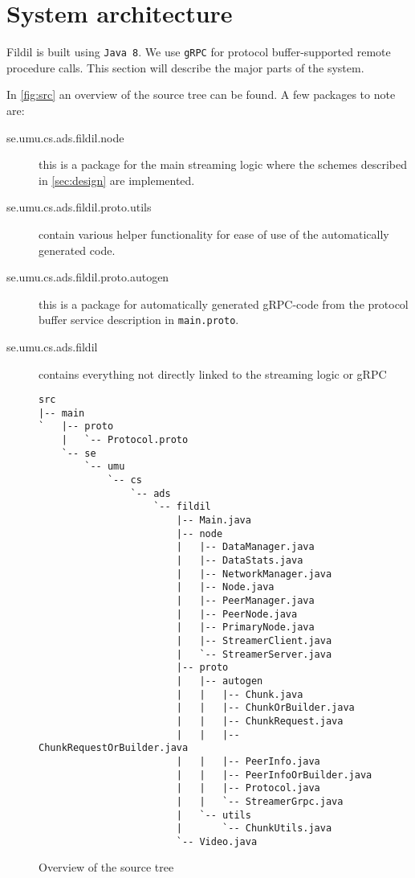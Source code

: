 \documentclass[10pt, a4paper]{article}
\begin{document}
\section{System architecture}
\label{sec:system}

Fildil is built using \texttt{Java 8}. We use \texttt{gRPC} for protocol
buffer-supported remote procedure calls. This section will describe the major
parts of the system.

In \autoref{fig:src} an overview of the source tree can be found. A few packages
to note are:

\begin{description}
\item[se.umu.cs.ads.fildil.node] this is a package for the main streaming logic
  where the schemes described in \autoref{sec:design} are implemented.
\item[se.umu.cs.ads.fildil.proto.utils] contain various helper functionality for
  ease of use of the automatically generated code.
\item[se.umu.cs.ads.fildil.proto.autogen] this is a package for automatically
  generated gRPC-code from the protocol buffer service description in
  \texttt{main.proto}.
\item[se.umu.cs.ads.fildil] contains everything not directly linked to the
  streaming logic or gRPC
\end{description}


\begin{figure}[H]
\begin{Verbatim}[frame=single]
src
|-- main
`   |-- proto
    |   `-- Protocol.proto
    `-- se
        `-- umu
            `-- cs
                `-- ads
                    `-- fildil
                        |-- Main.java
                        |-- node
                        |   |-- DataManager.java
                        |   |-- DataStats.java
                        |   |-- NetworkManager.java
                        |   |-- Node.java
                        |   |-- PeerManager.java
                        |   |-- PeerNode.java
                        |   |-- PrimaryNode.java
                        |   |-- StreamerClient.java
                        |   `-- StreamerServer.java
                        |-- proto
                        |   |-- autogen
                        |   |   |-- Chunk.java
                        |   |   |-- ChunkOrBuilder.java
                        |   |   |-- ChunkRequest.java
                        |   |   |-- ChunkRequestOrBuilder.java
                        |   |   |-- PeerInfo.java
                        |   |   |-- PeerInfoOrBuilder.java
                        |   |   |-- Protocol.java
                        |   |   `-- StreamerGrpc.java
                        |   `-- utils
                        |       `-- ChunkUtils.java
                        `-- Video.java
\end{Verbatim}
\caption{Overview of the source tree}
\label{fig:src}
\end{figure}
\end{document}
